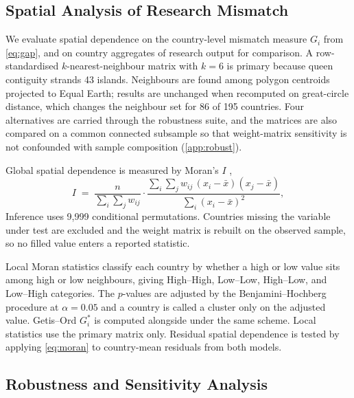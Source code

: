 \documentclass[ASNA,twocolumn]{USG}
\begin{document}
\subsection{Spatial Analysis of Research Mismatch}

We evaluate spatial dependence on the country-level mismatch measure $G_{i}$ from
\eqref{eq:gap}, and on country aggregates of research output for comparison. A row-standardised $k$-nearest-neighbour matrix with $k=6$ is primary because queen contiguity
strands 43 islands. Neighbours are found among polygon centroids projected to Equal Earth; results are unchanged when
recomputed on great-circle distance, which changes the neighbour set for 86 of 195 countries. Four alternatives are carried through the robustness suite, and the matrices are also
compared on a common connected subsample so that weight-matrix sensitivity is not confounded
with sample composition (\ref{app:robust}).

Global spatial dependence is measured by Moran's $I$ \cite{Moran1950},
\begin{equation}
I \;=\; \frac{n}{\sum_{i}\sum_{j} w_{ij}} \cdot
\frac{\sum_{i}\sum_{j} w_{ij}\,(x_{i}-\bar{x})(x_{j}-\bar{x})}{\sum_{i}(x_{i}-\bar{x})^{2}},
\label{eq:moran}
\end{equation}
Inference uses 9,999 conditional permutations.
Countries missing the variable under test are excluded and the weight matrix is rebuilt on
the observed sample, so no filled value enters a reported statistic.

Local Moran statistics \cite{Anselin1995} classify each country by whether a high or low
value sits among high or low neighbours, giving High--High, Low--Low, High--Low, and
Low--High categories. The $p$-values are
adjusted by the Benjamini--Hochberg procedure \cite{BenjaminiHochberg1995} at $\alpha=0.05$
and a country is called a cluster only on the adjusted value. Getis--Ord $G^{*}_{i}$
\cite{GetisOrd1992} is computed alongside under the same scheme. Local statistics use the
primary matrix only. Residual spatial dependence is tested by applying \eqref{eq:moran} to
country-mean residuals from both models.

\subsection{Robustness and Sensitivity Analysis}
\end{document}
